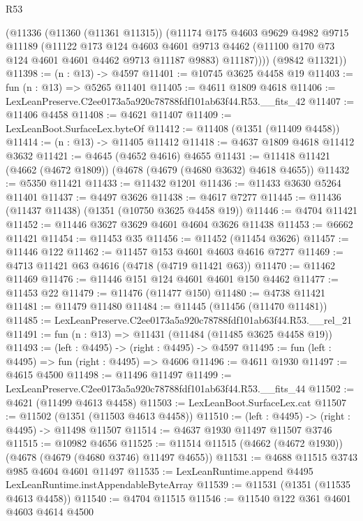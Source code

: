 \begin{lexlean}{R53}
\begin{coremodule}
        (@11336
          (@11360 (@11361 @11315))
          (@11174
            @175
            @4603
            @9629
            @4982
            @9715
            @11189
            (@11122
              @173
              @124
              @4603
              @4601
              @9713
              @4462
              (@11100 @170 @73 @124 @4601 @4601 @4462 @9713 @11187 @9883)
              @11187))))
      (@9842 @11321))
@11398 := (n : @13) -> @4597
@11401 := @10745 @3625 @4458 @19
@11403 := fun (n : @13) => @5265 @11401
@11405 := @4611 @1809 @4618
@11406 := LexLeanPreserve.C2ee0173a5a920c78788fdf101ab63f44.R53.__fits_42
@11407 := @11406 @4458
@11408 := @4621 @11407
@11409 := LexLeanBoot.SurfaceLex.byteOf
@11412 := @11408 (@1351 (@11409 @4458))
@11414 := (n : @13) -> @11405 @11412
@11418 := @4637 @1809 @4618 @11412 @3632
@11421 := @4645 (@4652 @4616) @4655
@11431 := @11418 @11421 (@4662 (@4672 @1809)) (@4678 (@4679 (@4680 @3632) @4618 @4655))
@11432 := @5350 @11421
@11433 := @11432 @1201
@11436 := @11433 @3630 @5264 @11401
@11437 := @4497 @3626
@11438 := @4617 @7277
@11445 := @11436 (@11437 @11438) (@1351 (@10750 @3625 @4458 @19))
@11446 := @4704 @11421
@11452 := @11446 @3627 @3629 @4601 @4604 @3626 @11438
@11453 := @6662 @11421
@11454 := @11453 @35
@11456 := @11452 (@11454 @3626)
@11457 := @11446 @122
@11462 := @11457 @153 @4601 @4603 @4616 @7277
@11469 := @4713 @11421 @63 @4616 (@4718 (@4719 @11421 @63))
@11470 := @11462 @11469
@11476 := @11446 @151 @124 @4601 @4601 @150 @4462
@11477 := @11453 @22
@11479 := @11476 (@11477 @150)
@11480 := @4738 @11421
@11481 := @11479 @11480
@11484 := @11445 (@11456 (@11470 @11481))
@11485 := LexLeanPreserve.C2ee0173a5a920c78788fdf101ab63f44.R53.__rel_21
@11491 := fun (n : @13) => @11431 (@11484 (@11485 @3625 @4458 @19))
@11493 := (left : @4495) -> (right : @4495) -> @4597
@11495 := fun (left : @4495) => fun (right : @4495) => @4606
@11496 := @4611 @1930
@11497 := @4615 @4500
@11498 := @11496 @11497
@11499 := LexLeanPreserve.C2ee0173a5a920c78788fdf101ab63f44.R53.__fits_44
@11502 := @4621 (@11499 @4613 @4458)
@11503 := LexLeanBoot.SurfaceLex.cat
@11507 := @11502 (@1351 (@11503 @4613 @4458))
@11510 := (left : @4495) -> (right : @4495) -> @11498 @11507
@11514 := @4637 @1930 @11497 @11507 @3746
@11515 := @10982 @4656
@11525 := @11514 @11515 (@4662 (@4672 @1930)) (@4678 (@4679 (@4680 @3746) @11497 @4655))
@11531 := @4688 @11515 @3743 @985 @4604 @4601 @11497
@11535 := LexLeanRuntime.append @4495 LexLeanRuntime.instAppendableByteArray
@11539 := @11531 (@1351 (@11535 @4613 @4458))
@11540 := @4704 @11515
@11546 := @11540 @122 @361 @4601 @4603 @4614 @4500

\end{coremodule}
\end{lexlean}
